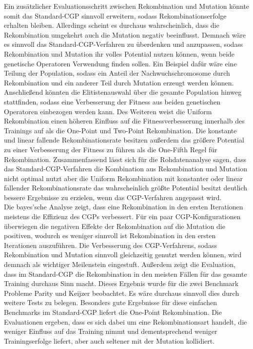 Ein zusätzlicher Evaluationsschritt zwischen Rekombination und Mutation könnte somit das Standard-CGP sinnvoll erweitern, sodass Rekombinationserfolge erhalten bleiben.
Allerdings scheint es durchaus wahrscheinlich, dass die Rekombination umgekehrt auch die Mutation negativ beeinflusst.
Demnach wäre es sinnvoll das Standard-CGP-Verfahren zu überdenken und anzupassen, sodass Rekombination und Mutation ihr volles Potential nutzen können, wenn beide genetische Operatoren Verwendung finden sollen.
Ein Beispiel dafür wäre eine Teilung der Population, sodass ein Anteil der Nachwuchschromosome durch Rekombination und ein anderer Teil durch Mutation erzeugt werden können.
Anschließend könnten die Elitistenauswahl über die gesamte Population hinweg stattfinden, sodass eine Verbesserung der Fitness aus beiden genetischen Operatoren einbezogen werden kann.
Des Weiteren weist die Uniform Rekombination einen höheren Einfluss auf die Fitnessverbesserung innerhalb des Trainings auf als die One-Point und Two-Point Rekombination.
Die konstante und linear fallende Rekombinationsrate besitzen außerdem das größere Potential zu einer Verbesserung der Fitness zu führen als die One-Fifth Regel für Rekombination.
Zusammenfassend lässt sich für die Rohdatenanalyse sagen, dass das Standard-CGP-Verfahren die Kombination aus Rekombination und Mutation nicht optimal nutzt aber die Uniform Rekombination mit konstanter oder linear fallender Rekombinationsrate das wahrscheinlich größte Potential besitzt deutlich bessere Ergebnisse zu erzielen, wenn das CGP-Verfahren angepasst wird.\\
Die bayes'sche Analyse zeigt, dass eine Rekombination in den ersten Iterationen meistens die Effizienz des CGPs verbessert.
Für ein paar CGP-Konfigurationen überwiegen die negativen Effekte der Rekombination auf die Mutation die positiven, wodurch es weniger sinnvoll ist Rekombination in den ersten Iterationen auszuführen.
Die Verbesserung des CGP-Verfahrens, sodass Rekombination und Mutation sinnvoll gleichzeitig genutzt werden können, wird demnach als wichtiger Meilenstein eingestuft.
Außerdem zeigt die Evaluation, dass im Standard-CGP die Rekombination in den meisten Fällen für das gesamte Training durchaus Sinn macht.
Dieses Ergebnis wurde für die zwei Benchmark Probleme Parity und Keijzer beobachtet.
Es wäre durchaus sinnvoll dies durch weitere Tests zu belegen.
Besonders gute Ergebnisse für diese einfachen Benchmarks im Standard-CGP liefert die One-Point Rekombination.
Die Evaluationen ergeben, dass es sich dabei um eine Rekombinationsart handelt, die weniger Einfluss auf das Training nimmt und dementsprechend weniger Trainingserfolge liefert, aber auch seltener mit der Mutation kollidiert.

